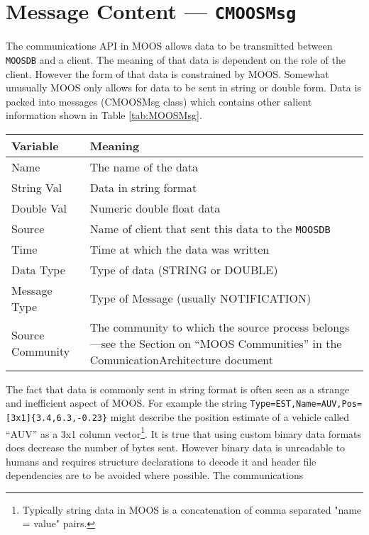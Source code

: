 \documentclass[a4paper,10pt]{article}
\newcommand{\Code}[1]{\texttt{#1} }
\newcommand{\code}[1]{\Code{#1} }
\newcommand{\DB}   {\code{{MOOSDB}}}
\begin{document}
\section{Message Content --- \code{CMOOSMsg} } \label{Sec:CMOOSMsg}
The communications API in MOOS allows data to be transmitted
between \DB and a client. The meaning of that data is dependent on
the role of the client. However the form of that data is
constrained by MOOS. Somewhat unusually MOOS only allows for data
to be sent in string or double form. Data is packed into messages
(CMOOSMsg class) which contains other salient information shown in
Table \ref{tab:MOOSMsg}.
\begin{table*}
\centering
\begin{tabular}{l|l}\hline
  {\textbf{Variable}} & {\textbf{Meaning}} \\ \hline
  Name  & The name of the data \\
  String Val & Data in string format \\
  Double Val & Numeric double float data \\
  Source & Name of client that sent this data to the \DB \\
  Time & Time at which the data was written \\
  Data Type & Type of data (STRING or DOUBLE)  \\
  Message Type & Type of Message (usually NOTIFICATION) \\
  Source Community & The community to which the source process
belongs---see the Section on ``MOOS Communities'' in the ComunicationArchitecture document\\\hline
\end{tabular}\vspace{7mm}
  \caption{Contents of MOOS Message}\label{tab:MOOSMsg}
\end{table*}
The fact that data is commonly sent in string format is often seen
as a strange and inefficient aspect of MOOS. For example the
string \verb"Type=EST,Name=AUV,Pos=[3x1]{3.4,6.3,-0.23}" might
describe the position estimate of a vehicle called ``AUV'' as a
3x1 column vector\footnote{Typically string data in MOOS is a
concatenation of comma separated "name = value" pairs.}. It is
true that using custom binary data formats does decrease the
number of bytes sent. However binary data is unreadable to humans
and requires structure declarations to decode it and header file
dependencies are to be avoided where possible. The communications
\end{document}
